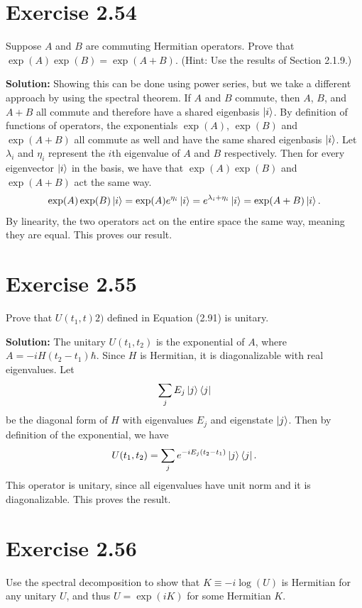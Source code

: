 \documentclass{book}
\begin{document}
\section*{Exercise 2.54}
    Suppose $A$ and $B$ are commuting Hermitian operators. Prove that $\exp(A) \exp(B) = \exp(A + B)$. (Hint: Use the results of Section 2.1.9.)
    
    \textbf{Solution:} Showing this can be done using power series, but we take a different approach by using the spectral theorem. If $A$ and $B$ commute, then $A$, $B$, and $A+B$ all commute and therefore have a shared eigenbasis $\ket{i}$. By definition of functions of operators, the exponentials $\exp(A)$, $\exp(B)$ and $\exp(A+B)$ all commute as well and have the same shared eigenbasis $\ket{i}$. Let $\lambda_i$ and $\eta_i$ represent the $i$th eigenvalue of $A$ and $B$ respectively. Then for every eigenvector $\ket{i}$ in the basis, we have that $\exp(A)\exp(B)$ and $\exp(A+B)$ act the same way.
    \begin{align}
        \exp(A)\exp(B) \ket{i} = \exp(A) e^{\eta_i} \ket{i} = e^{\lambda_i + \eta_i} \ket{i} = \exp(A+B) \ket{i}.
    \end{align}
    By linearity, the two operators act on the entire space the same way, meaning they are equal. This proves our result.
    
\section*{Exercise 2.55}
    Prove that $U(t_1,t)2)$ defined in Equation (2.91) is unitary.
    
    \textbf{Solution:} The unitary $U(t_1,t_2)$ is the exponential of $A$, where $A = -i H (t_2 - t_1)\hbar$. Since $H$ is Hermitian, it is diagonalizable with real eigenvalues. Let
    \begin{align}
        \sum_j E_j \ket{j}\bra{j}
    \end{align}
    be the diagonal form of $H$ with eigenvalues $E_j$ and eigenstate $\ket{j}$. Then by definition of the exponential, we have
    \begin{align}
        U(t_1, t_2) = \sum_j e^{-i E_j (t_2-t_1)} \ket{j}\bra{j}.
    \end{align}
    This operator is unitary, since all eigenvalues have unit norm and it is diagonalizable. This proves the result.
    
\section*{Exercise 2.56}
    Use the spectral decomposition to show that $K \equiv -i \log(U)$ is Hermitian for any unitary $U$, and thus $U = \exp(iK)$ for some Hermitian $K$.
    
\end{document}
